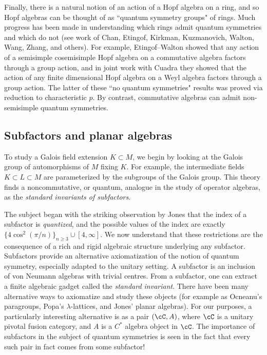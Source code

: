 \documentclass[12pt]{article}
\begin{document}
Finally, there is a natural notion of an action of a Hopf algebra on a ring, and so Hopf algebras can be thought of as ``quantum symmetry groups" of rings. Much progress has been made in understanding which rings admit quantum symmetries and which do not (see work of Chan, Etingof, Kirkman, Kuzmanovich, Walton, Wang, Zhang, and others).  For example, Etingof--Walton showed that any action of a semisimple cosemisimple Hopf algebra on a commutative algebra factors through a group action, and in joint work with Cuadra they showed that the action of any finite dimensional Hopf algebra on a Weyl algebra factors through a group action. The latter of these ``no quantum symmetries" results was proved via reduction to characteristic $p$. By contrast, commutative algebras can admit non-semisimple quantum symmetries.

\subsection{Subfactors and planar algebras}
To study a Galois field extension $K \subset M$, we begin by looking at the
Galois group of automorphisms of $M$ fixing $K$. For example, the intermediate
fields $K \subset L \subset M$ are parameterized by the subgroups of the
Galois group. This theory finds a noncommutative, or quantum, analogue in the
study of operator algebras, as the \emph{standard invariants of subfactors}.

The subject began with the striking observation by Jones that the index of a
subfactor is \emph{quantized}, and the possible values of the index are
exactly $\{4 \cos^2(\pi/n)\}_{n \geq 3} \cup [4,\infty]$. We now understand
that these restrictions are the consequence of a rich and rigid algebraic
structure underlying any subfactor.
Subfactors provide an alternative axiomatization of the notion of quantum
symmetry, especially adapted to the unitary setting. A subfactor is an
inclusion of von Neumann algebras with trivial centres. From a subfactor, one
can extract a finite algebraic gadget called the \emph{standard invariant}.
There have been many alternative ways to axiomatize and study these objects
(for example as Ocneanu's paragroups, Popa's $\lambda$-lattices, and Jones'
planar algebras). For our purposes, a particularly interesting
alternative is as a pair $(\cC, A)$, where $\cC$ is a unitary pivotal fusion
category, and $A$ is a $C^*$ algebra object in $\cC$. The importance of subfactors
in the subject of quantum symmetries is seen in the fact that every such pair
in fact comes from some subfactor!
\end{document}
